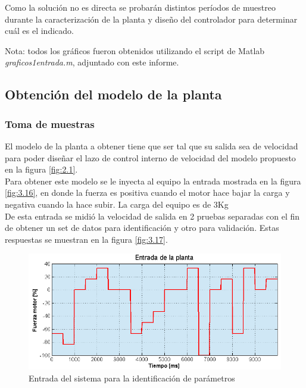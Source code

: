 Como la solución no es directa se probarán distintos períodos de muestreo durante la caracterización de la planta y diseño del controlador para determinar cuál es el indicado.

\textcolor{FIXME}{Nota: todos los gráficos fueron obtenidos utilizando el script de Matlab \textit{graficos1entrada.m}, adjuntado con este informe.}

\subsection{Obtención del modelo de la planta}
\subsubsection{Toma de muestras}
El modelo de la planta a obtener tiene que ser tal que su salida sea de velocidad para poder diseñar el lazo de control interno de velocidad del modelo propuesto en la figura \ref{fig:2.1}.\\
Para obtener este modelo se le inyecta al equipo la entrada mostrada en la figura \ref{fig:3.16}, en donde la fuerza es positiva cuando el motor hace bajar la carga y negativa cuando la hace subir. La carga del equipo es de 3Kg\\
De esta entrada se midió la velocidad de salida en 2 pruebas separadas con el fin de obtener un set de datos para identificación y otro para validación. Estas respuestas se muestran en la figura \ref{fig:3.17}.

\begin{figure}[!ht]
	\centering
	\includegraphics[width=16cm,scale=1]{resources/3_16-entradaIdentPlanta.png}
	\caption{Entrada del sistema para la identificación de parámetros}
	\label{fig:\thefigure}
\end{figure}

